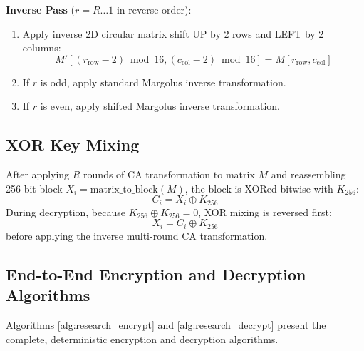 \textbf{Inverse Pass} ($r = R \dots 1$ in reverse order):
\begin{enumerate}
    \item Apply inverse 2D circular matrix shift UP by 2 rows and LEFT by 2 columns:
    \begin{equation}
    M'[(r_{\text{row}} - 2) \bmod 16, (c_{\text{col}} - 2) \bmod 16] = M[r_{\text{row}}, c_{\text{col}}]
    \label{eq:shift_up_left}
    \end{equation}
    \item If $r$ is odd, apply standard Margolus inverse transformation.
    \item If $r$ is even, apply shifted Margolus inverse transformation.
\end{enumerate}

\subsection{XOR Key Mixing}
\label{subsec:xor_mixing}
After applying $R$ rounds of CA transformation to matrix $M$ and reassembling 256-bit block $X_i = \text{matrix\_to\_block}(M)$, the block is XORed bitwise with $K_{256}$:
\begin{equation}
C_i = X_i \oplus K_{256}
\label{eq:xor_encrypt}
\end{equation}
During decryption, because $K_{256} \oplus K_{256} = 0$, XOR mixing is reversed first:
\begin{equation}
X_i = C_i \oplus K_{256}
\label{eq:xor_decrypt}
\end{equation}
before applying the inverse multi-round CA transformation.

\subsection{End-to-End Encryption and Decryption Algorithms}
\label{subsec:algorithms}

Algorithms \ref{alg:research_encrypt} and \ref{alg:research_decrypt} present the complete, deterministic encryption and decryption algorithms.

